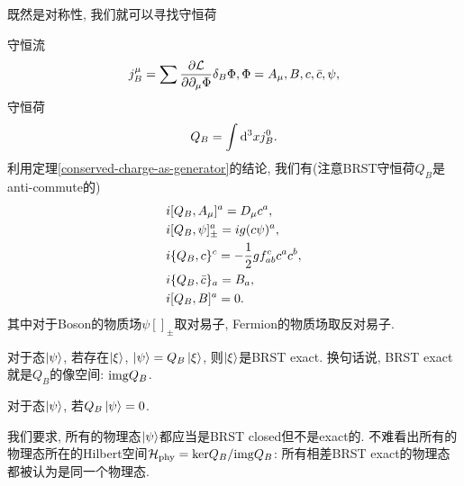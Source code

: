 既然是对称性, 我们就可以寻找守恒荷
\begin{definition}[BRST守恒荷]
    守恒流
    \begin{align}
        j^\mu_B=\sum\frac{\partial \mathcal L}{\partial \partial_\mu\Phi}\delta_B\Phi, \Phi=A_\mu, B, c, \bar c, \psi,
    \end{align}
    守恒荷
    \begin{align}
        Q_B=\int\mathrm d^3x j^0_B.
    \end{align}
    利用定理\ref{conserved-charge-as-generator}的结论, 我们有(注意BRST守恒荷$Q_B$是anti-commute的)
    \begin{align}
        & i[Q_B, A_\mu]^a=D_\mu c^a,\notag\\
        & i[Q_B, \psi]_{\pm}^a=ig(c\psi)^a,\notag\\
        & i\{Q_B, c\}^c=-\frac12g f^{c}_{ab}c^ac^b,\notag\\
        & i\{Q_B, \bar c\}_a=B_a,\notag\\
        & i[Q_B, B]^a=0.\label{BRST-commutator}
    \end{align}
    其中对于Boson的物质场$\psi$$[]_{\pm}$取对易子, Fermion的物质场取反对易子.
\end{definition}
\begin{definition}
    对于态$\ket\psi$, 若存在$\ket\xi$, $\ket\psi=Q_B\ket\xi$, 则$\ket\xi$是BRST exact. 换句话说, BRST exact就是$Q_B$的像空间: $\mathrm{img} Q_B$.
\end{definition}
\begin{definition}
    对于态$\ket\psi$, 若$Q_B\ket\psi=0$.
\end{definition}

我们要求, 所有的物理态$\ket\psi$都应当是BRST closed但不是exact的. 不难看出所有的物理态所在的Hilbert空间$\mathcal H_{\mathrm{phy}}=\mathrm{ker} Q_B/\mathrm{img} Q_B$: 所有相差BRST exact的物理态都被认为是同一个物理态.

